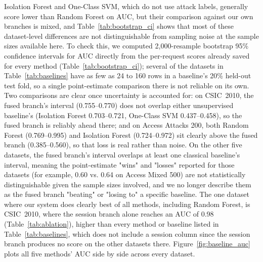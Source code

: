 \documentclass[futureinternet,article,submit,moreauthors]{Definitions/mdpi}
\begin{document}
Isolation Forest and One-Class SVM, which do not use attack labels, generally score lower than Random Forest on AUC, but their comparison against our own branches is mixed, and Table~\ref{tab:bootstrap_ci} shows that most of these dataset-level differences are not distinguishable from sampling noise at the sample sizes available here. To check this, we computed 2{,}000-resample bootstrap 95\% confidence intervals for AUC directly from the per-request scores already saved for every method (Table~\ref{tab:bootstrap_ci}); several of the datasets in Table~\ref{tab:baselines} have as few as 24 to 160 rows in a baseline's 20\% held-out test fold, so a single point-estimate comparison there is not reliable on its own. Two comparisons are clear once uncertainty is accounted for: on CSIC~2010, the fused branch's interval (0.755--0.770) does not overlap either unsupervised baseline's (Isolation Forest 0.703--0.721, One-Class SVM 0.437--0.458), so the fused branch is reliably ahead there; and on Access Attacks 200, both Random Forest (0.769--0.995) and Isolation Forest (0.724--0.972) sit clearly above the fused branch (0.385--0.560), so that loss is real rather than noise. On the other five datasets, the fused branch's interval overlaps at least one classical baseline's interval, meaning the point-estimate "wins" and "losses" reported for those datasets (for example, 0.60 vs. 0.64 on Access Mixed 500) are not statistically distinguishable given the sample sizes involved, and we no longer describe them as the fused branch "beating" or "losing to" a specific baseline. The one dataset where our system does clearly best of all methods, including Random Forest, is CSIC~2010, where the session branch alone reaches an AUC of 0.98 (Table~\ref{tab:ablation}), higher than every method or baseline listed in Table~\ref{tab:baselines}, which does not include a session column since the session branch produces no score on the other datasets there. Figure~\ref{fig:baseline_auc} plots all five methods' AUC side by side across every dataset.
\end{document}
